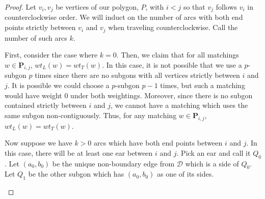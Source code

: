 \documentclass[12pt]{article}
\theoremstyle{remark}
\newcommand*{\pathset}[2]{\mathbf{P}_{#1,#2}}
\newcommand*{\D}{\mathcal{D}}
\begin{document}
\begin{proof}
Let $v_i,v_j$ be vertices of our polygon, $P$, with $i < j$ so that $v_j$ follows $v_i$ in counterclockwise order. We will induct on the number of arcs with both end points strictly between $v_i$ and $v_j$ when traveling counterclockwise. Call the number of such arcs $k$. 

First, consider the case where $k = 0$. Then, we claim that for all matchings $w \in \pathset{i}{j}$, $wt_L(w) = wt_T(w)$. In this case, it is not possible that we use a $p$-subgon $p$ times since there are no subgons with all vertices strictly between $i$ and $j$. It is possible we could choose a $p$-subgon $p-1$ times, but such a matching would have weight 0 under both weightings. Moreover, since there is no subgon contained strictly between $i$ and $j$,  we cannot have a matching which uses the same subgon non-contiguously. Thus, for any matching $w \in \pathset{i}{j}$, $wt_L(w) = wt_T(w)$.


Now suppose we have $k > 0$ arcs which have both end points between $i$ and $j$. In this case, there will be at least one ear between $i$ and $j$. Pick an ear and call it $Q_0$. Let $(a_0,b_0)$ be the unique non-boundary edge from $\D$ which is a side of $Q_0$. Let $Q_1$ be the other subgon which has $(a_0,b_0)$ as one of its sides. 

 \begin{center}
\end{center}


\end{proof}
\end{document}
